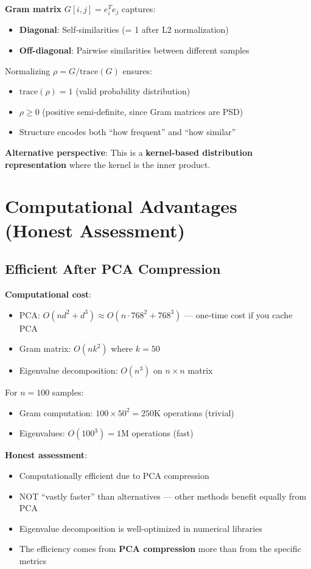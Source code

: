 \documentclass[11pt]{article}
\newcommand{\cmark}{✓}
\newcommand{\xmark}{✗}
\begin{document}
\textbf{Gram matrix} $G[i,j] = e_i^T e_j$ captures:
\begin{itemize}
\item \textbf{Diagonal}: Self-similarities (= 1 after L2 normalization)
\item \textbf{Off-diagonal}: Pairwise similarities between different samples
\end{itemize}

Normalizing $\rho = G / \text{trace}(G)$ ensures:
\begin{itemize}
\item $\text{trace}(\rho) = 1$ (valid probability distribution)
\item $\rho \geq 0$ (positive semi-definite, since Gram matrices are PSD)
\item Structure encodes both ``how frequent'' and ``how similar''
\end{itemize}

\textbf{Alternative perspective}: This is a \textbf{kernel-based distribution representation} where the kernel is the inner product.

\section{Computational Advantages (Honest Assessment)}

\subsection{Efficient After PCA Compression}

\textbf{Computational cost}:
\begin{itemize}
\item PCA: $O(nd^2 + d^3) \approx O(n \cdot 768^2 + 768^3)$ --- one-time cost if you cache PCA
\item Gram matrix: $O(nk^2)$ where $k=50$
\item Eigenvalue decomposition: $O(n^3)$ on $n \times n$ matrix
\end{itemize}

For $n=100$ samples:
\begin{itemize}
\item Gram computation: $100 \times 50^2 = 250\text{K}$ operations (trivial)
\item Eigenvalues: $O(100^3) = 1\text{M}$ operations (fast)
\end{itemize}

\textbf{Honest assessment}:
\begin{itemize}
\item[\cmark] Computationally efficient due to PCA compression
\item[\xmark] NOT ``vastly faster'' than alternatives --- other methods benefit equally from PCA
\item[\cmark] Eigenvalue decomposition is well-optimized in numerical libraries
\item The efficiency comes from \textbf{PCA compression} more than from the specific metrics
\end{itemize}
\end{document}
